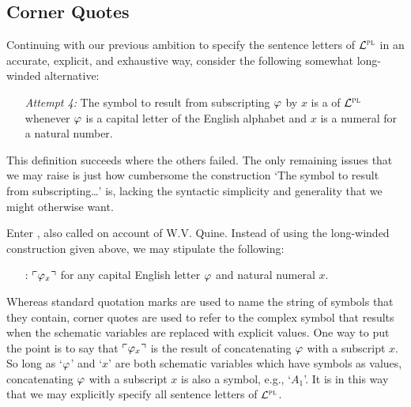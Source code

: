 \subsection{Corner Quotes}%
  \label{sub:corner-quotes}


Continuing with our previous ambition to specify the sentence letters of $\mathcal{L}^{\textsc{pl}}$ in an accurate, explicit, and exhaustive way, consider the following somewhat long-winded alternative:

\begin{enumerate}[leftmargin=1.25in, itemsep=-.4em]
  \item[\it Attempt 4:] The symbol to result from subscripting $\varphi$ by $x$ is a  of $\mathcal{L}^{\textsc{pl}}$ whenever $\varphi$ is a capital letter of the English alphabet and $x$ is a numeral for a natural number. 
\end{enumerate}

This definition succeeds where the others failed.
The only remaining issues that we may raise is just how cumbersome the construction `The symbol to result from subscripting\ldots' is, lacking the syntactic simplicity and generality that we might otherwise want.

Enter , also called  on account of W.V. Quine.
Instead of using the long-winded construction given above, we may stipulate the following:

\begin{enumerate}[leftmargin=2.25in, itemsep=-.4em]
  \item[\define{sentence letters}:] $\ulcorner\varphi_x\urcorner$ for any capital English letter $\varphi$ and natural numeral $x$. 
\end{enumerate}

Whereas standard quotation marks are used to name the string of symbols that they contain, corner quotes are used to refer to the complex symbol that results when the schematic variables are replaced with explicit values.
One way to put the point is to say that $\ulcorner\varphi_x\urcorner$ is the result of concatenating $\varphi$ with a subscript $x$.
So long as `$\varphi$' and `$x$' are both schematic variables which have symbols as values, concatenating $\varphi$ with a subscript $x$ is also a symbol, e.g., `$A_1$'.
It is in this way that we may explicitly specify all sentence letters of $\mathcal{L}^{\textsc{pl}}$.





